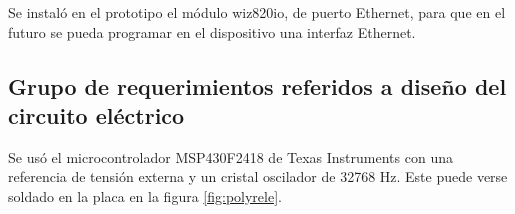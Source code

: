 Se instaló en el prototipo el módulo wiz820io, de puerto Ethernet, para que en el futuro se pueda programar en el dispositivo una interfaz Ethernet.



 

\subsection{Grupo de requerimientos referidos a diseño del circuito eléctrico}






Se usó el microcontrolador MSP430F2418 de Texas Instruments con una referencia de tensión externa y un cristal oscilador de 32768 Hz. Este puede verse soldado en la placa en la figura \ref{fig:polyrele}.

